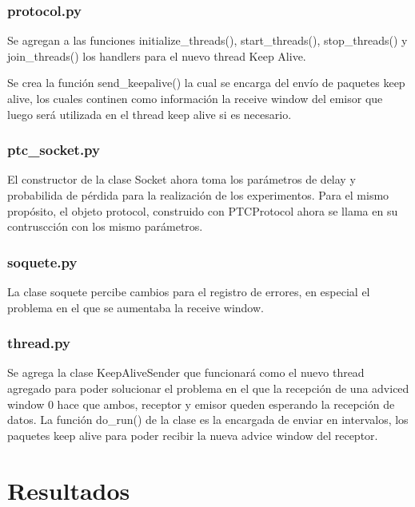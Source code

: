 \documentclass[a4paper, 10pt, twoside]{article}
\begin{document}
\subsubsection{protocol.py}
Se agregan a las funciones initialize\_threads(), start\_threads(), stop\_threads() y join\_threads() los handlers para el nuevo thread Keep Alive.

Se crea la función send\_keepalive() la cual se encarga del envío de paquetes keep alive, los cuales continen como información la receive window del emisor que luego será utilizada en el thread keep alive si es necesario.

\subsubsection{ptc\_socket.py}
El constructor de la clase Socket ahora toma los parámetros de delay y probabilida de pérdida para la realización de los experimentos. Para el mismo propósito, el objeto protocol, construido con PTCProtocol ahora se llama en su contruscción con los mismo parámetros.


\subsubsection{soquete.py}
La clase soquete percibe cambios para el registro de errores, en especial el problema en el que se aumentaba la receive window.

\subsubsection{thread.py}
Se agrega la clase KeepAliveSender que funcionará como el nuevo thread agregado para poder solucionar el problema en el que la recepción de una adviced window 0 hace que ambos, receptor y emisor queden esperando la recepción de datos. La función do\_run() de la clase es la encargada de enviar en intervalos, los paquetes keep alive para poder recibir la nueva advice window del receptor.




\section{Resultados}
\label{sec:resultados}
\end{document}
